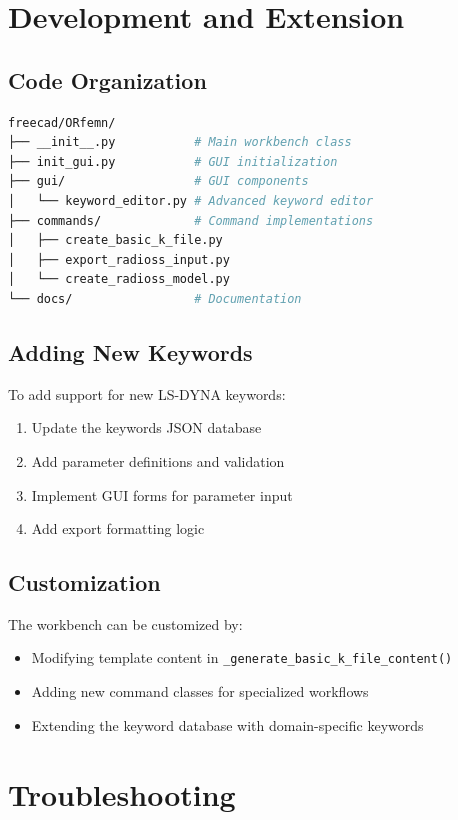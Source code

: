 \documentclass[12pt,a4paper]{article}
\begin{document}
\section{Development and Extension}

\subsection{Code Organization}
\begin{lstlisting}[language=bash, caption=Project structure]
freecad/ORfemn/
├── __init__.py           # Main workbench class
├── init_gui.py           # GUI initialization
├── gui/                  # GUI components
│   └── keyword_editor.py # Advanced keyword editor
├── commands/             # Command implementations
│   ├── create_basic_k_file.py
│   ├── export_radioss_input.py
│   └── create_radioss_model.py
└── docs/                 # Documentation
\end{lstlisting}

\subsection{Adding New Keywords}
To add support for new LS-DYNA keywords:

\begin{enumerate}
    \item Update the keywords JSON database
    \item Add parameter definitions and validation
    \item Implement GUI forms for parameter input
    \item Add export formatting logic
\end{enumerate}

\subsection{Customization}
The workbench can be customized by:
\begin{itemize}
    \item Modifying template content in \texttt{\_generate\_basic\_k\_file\_content()}
    \item Adding new command classes for specialized workflows
    \item Extending the keyword database with domain-specific keywords
\end{itemize}

\section{Troubleshooting}
\end{document}
